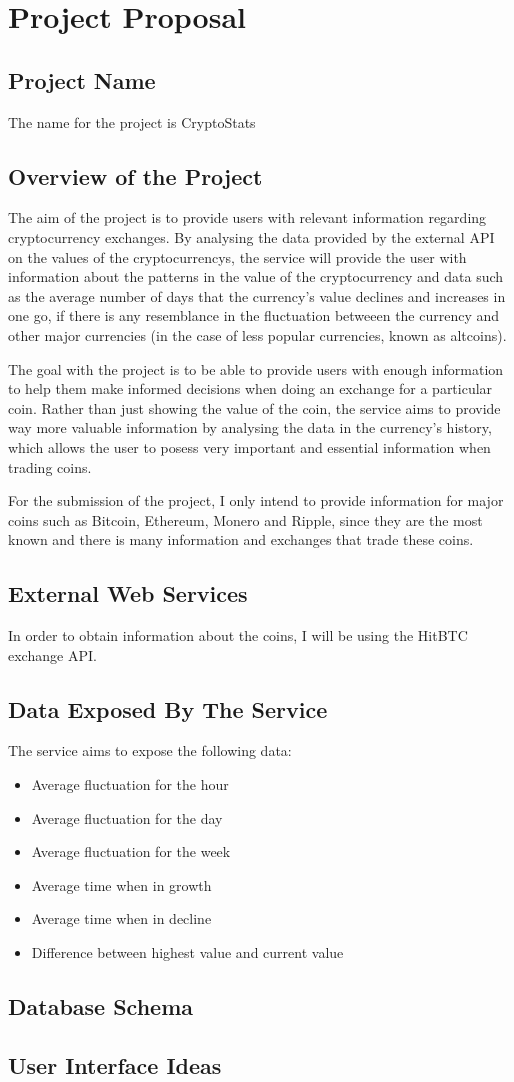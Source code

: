 \chapter{Project Proposal}
\section{Project Name}
The name for the project is CryptoStats
\section{Overview of the Project}
The aim of the project is to provide users with relevant information regarding cryptocurrency exchanges. By analysing the data provided by the external API on the values of the cryptocurrencys, the service will provide the user with information about the patterns in the value of the cryptocurrency and data such as the average number of days that the currency's value declines and increases in one go, if there is any resemblance in the fluctuation betweeen the currency and other major currencies (in the case of less popular currencies, known as altcoins).

The goal with the project is to be able to provide users with enough information to help them make informed decisions when doing an exchange for a particular coin. Rather than just showing the value of the coin, the service aims to provide way more valuable information by analysing the data in the currency's history, which allows the user to posess very important and essential information when trading coins.

For the submission of the project, I only intend to provide information for major coins such as Bitcoin, Ethereum, Monero and Ripple, since they are the most known and there is many information and exchanges that trade these coins.
\section{External Web Services}
In order to obtain information about the coins, I will be using the HitBTC exchange API.
\section{Data Exposed By The Service}
The service aims to expose the following data:
\begin{itemize}
    \item Average fluctuation for the hour
    \item Average fluctuation for the day
    \item Average fluctuation for the week
    \item Average time when in growth
    \item Average time when in decline
    \item Difference between highest value and current value
\end{itemize}
\section{Database Schema}
\section{User Interface Ideas}
